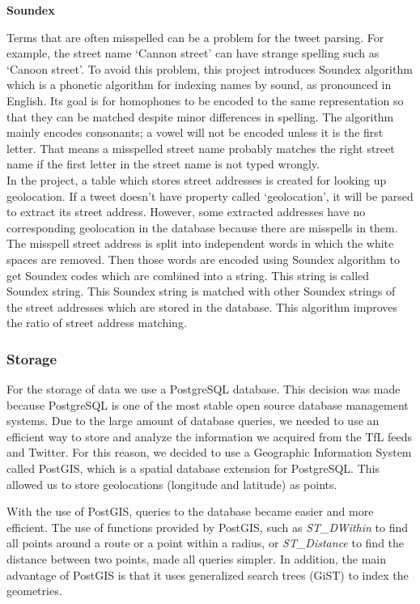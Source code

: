 \textbf{Soundex}

Terms that are often misspelled can be a problem for the tweet parsing. For example, the street name `Cannon street' can have strange spelling such as `Canoon street'. To avoid this problem, this project introduces Soundex algorithm which is a phonetic algorithm for indexing names by sound, as pronounced in English. Its goal is for homophones to be encoded to the same representation so that they can be matched despite minor differences in spelling. The algorithm mainly encodes consonants; a vowel will not be encoded unless it is the first letter. That means a misspelled street name probably matches the right street name if the first letter in the street name is not typed wrongly.\\
In the project, a table which stores street addresses is created for looking up geolocation. If a tweet doesn't have property called `geolocation', it will be parsed to extract its street address. However, some extracted addresses have no corresponding geolocation in the database because there are misspells in them. The misspell street address is split into independent words in which the white spaces are removed. Then those words are encoded using Soundex algorithm to get Soundex codes which are combined into a string. This string is called Soundex string. This Soundex string is matched with other Soundex strings of the street addresses which are stored in the database. This algorithm improves the ratio of street address matching.


\subsubsection{Storage}
For the storage of data we use a PostgreSQL database. This decision was made because PostgreSQL is one of the most stable open source database management systems. Due to the large amount of database queries, we needed to use an efficient way to store and analyze the information we acquired from the TfL feeds and Twitter. For this reason, we decided to use a Geographic Information System called PostGIS, which is a spatial database extension for PostgreSQL. This allowed us to store geolocations (longitude and latitude) as points.

With the use of PostGIS, queries to the database became easier and more efficient. The use of functions provided by PostGIS, such as \emph{ST\_DWithin} to find all points around a route or a point within a radius, or \emph{ST\_Distance} to find the distance between two points, made all queries simpler. In addition, the main advantage of PostGIS is that it uses generalized search trees (GiST) to index the geometries. 


